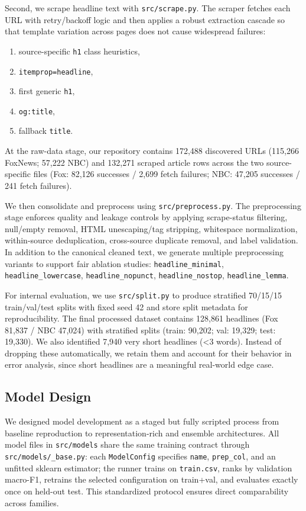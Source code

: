 \documentclass[10pt]{article}
\begin{document}
Second, we scrape headline text with \texttt{src/scrape.py}. The scraper fetches each URL with retry/backoff logic and then applies a robust extraction cascade so that template variation across pages does not cause widespread failures:
\begin{enumerate}
    \item source-specific \texttt{h1} class heuristics,
    \item \texttt{itemprop=headline},
    \item first generic \texttt{h1},
    \item \texttt{og:title},
    \item fallback \texttt{title}.
\end{enumerate}

At the raw-data stage, our repository contains 172,488 discovered URLs (115,266 FoxNews; 57,222 NBC) and 132,271 scraped article rows across the two source-specific files (Fox: 82,126 successes / 2,699 fetch failures; NBC: 47,205 successes / 241 fetch failures).

We then consolidate and preprocess using \texttt{src/preprocess.py}. The preprocessing stage enforces quality and leakage controls by applying scrape-status filtering, null/empty removal, HTML unescaping/tag stripping, whitespace normalization, within-source deduplication, cross-source duplicate removal, and label validation. In addition to the canonical cleaned text, we generate multiple preprocessing variants to support fair ablation studies:
\texttt{headline\_minimal}, \texttt{headline\_lowercase}, \texttt{headline\_nopunct}, \texttt{headline\_nostop}, \texttt{headline\_lemma}.

For internal evaluation, we use \texttt{src/split.py} to produce stratified 70/15/15 train/val/test splits with fixed seed 42 and store split metadata for reproducibility. The final processed dataset contains 128,861 headlines (Fox 81,837 / NBC 47,024) with stratified splits (train: 90,202; val: 19,329; test: 19,330). We also identified 7,940 very short headlines (\textless 3 words). Instead of dropping these automatically, we retain them and account for their behavior in error analysis, since short headlines are a meaningful real-world edge case.

\subsection{Model Design}
We designed model development as a staged but fully scripted process from baseline reproduction to representation-rich and ensemble architectures. All model files in \texttt{src/models} share the same training contract through \texttt{src/models/\_base.py}: each \texttt{ModelConfig} specifies \texttt{name}, \texttt{prep\_col}, and an unfitted sklearn estimator; the runner trains on \texttt{train.csv}, ranks by validation macro-F1, retrains the selected configuration on train+val, and evaluates exactly once on held-out test. This standardized protocol ensures direct comparability across families.
\end{document}
